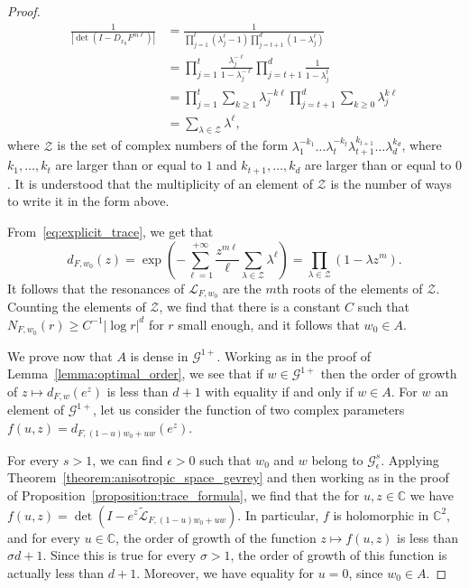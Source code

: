 \documentclass[10pt]{amsart}
\theoremstyle{definition}\newtheorem{defi}[theo]{Definition}\newtheorem{rema}[theo]{Remark}\newtheorem{exam}[theo]{Example}\newtheorem{exem}[theo]{Example}\newtheorem{nota}[theo]{Notation}
\newcommand{\p}[1]{\left(#1\right)}
\newcommand{\va}[1]{\left|#1\right|}
\newcommand{\clL}{\mathcal{L}}
\newcommand{\clG}{\mathcal{G}}
\newcommand{\clZ}{\mathcal{Z}}
\newcommand{\bbC}{\mathbb{C}}
\begin{document}
\begin{proof}
\begin{equation}\label{eq:explicit_trace}
\begin{split}
\frac{1}{\va{\det\p{I - D_{x_0} F^{m \ell}}}} & = \frac{1}{\prod_{j = 1}^t \left(\lambda_j^\ell - 1\right) \prod_{j = t+1}^{d} \left(1 - \lambda_j^{\ell}\right)} \\
& = \prod_{j = 1}^{t} \frac{\lambda_j^{- \ell} }{1 - \lambda_j^{- \ell}} \prod_{j = t+1}^{d} \frac{1}{1 - \lambda_j^t} \\
& = \prod_{j = 1}^t \sum_{k \geq 1} \lambda_j^{- k \ell} \prod_{j = t+1}^{d} \sum_{k \geq 0} \lambda_j^{k \ell} \\
& = \sum_{\lambda \in \clZ} \lambda^{\ell},
\end{split}
\end{equation}
where $\clZ$ is the set of complex numbers of the form $\lambda_1^{- k_1} \dots \lambda_{t}^{- k_t} \lambda_{t+1}^{k_{t+1}} \dots \lambda_d^{k_d}$, where $k_1, \dots, k_t$ are larger than or equal to $1$ and $k_{t+1},\dots,k_d$ are larger than or equal to $0$. It is understood that the multiplicity of an element of $\clZ$ is the number of ways to write it in the form above.

From~\eqref{eq:explicit_trace}, we get that
\begin{equation*}
d_{F,w_0}(z) = \exp\p{- \sum_{\ell = 1}^{+ \infty} \frac{z^{m \ell}}{\ell}\sum_{\lambda \in \clZ} \lambda^{\ell}} = \prod_{\lambda \in  \clZ}\left(1 - \lambda z^m\right).
\end{equation*}
It follows that the resonances of $\clL_{F,w_0}$ are the $m$th roots of the elements of $\clZ$. Counting the elements of $\clZ$, we find that there is a constant $C$ such that $N_{F,w_0}(r) \geq C^{-1} |\log r|^d$ for $r$ small enough, and it follows that $w_0 \in A$.

We prove now that $A$ is dense in $\clG^{1+}$. Working as in the proof of Lemma~\ref{lemma:optimal_order}, we see that if $w \in \clG^{1+}$ then the order of growth of $z \mapsto d_{F,w}(e^z)$ is less than $d+1$ with equality if and only if $w \in A$. For $w$ an element of $\clG^{1+}$, let us consider the function of two complex parameters $f(u,z) = d_{F, (1-u) w_0 + u w}(e^z)$.

For every $s > 1$, we can find $\epsilon > 0$ such that $w_0$ and $w$ belong to $\clG_{\epsilon}^s$. Applying Theorem~\ref{theorem:anisotropic_space_gevrey} and then working as in the proof of Proposition~\ref{proposition:trace_formula}, we find that the for $u,z \in \bbC$ we have $f(u,z) = \det\p{I - e^z \widetilde{\clL}_{F,(1-u) w_0 + u w}}$. In particular, $f$ is holomorphic in $\bbC^2$, and for every $u \in \bbC$, the order of growth of the function $z \mapsto f(u,z)$ is less than $\sigma d +1$. Since this is true for every $\sigma > 1$, the order of growth of this function is actually less than $d+1$. Moreover, we have equality for $u = 0$, since $w_0 \in A$.


\end{proof}
\end{document}

